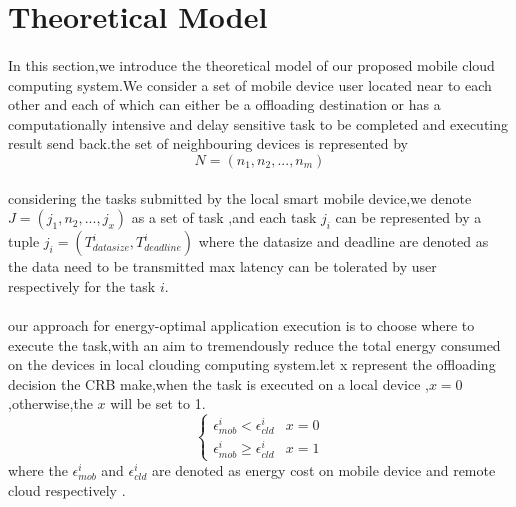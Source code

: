 \documentclass[review]{elsarticle}
\begin{document}
\section{Theoretical Model}
        \paragraph{}
        In this section,we introduce the theoretical model of our proposed mobile cloud computing system.We consider a set of mobile device user located near to each other and each of which can either be a offloading destination or has a computationally intensive and delay sensitive task to be completed and executing result send back.the set of neighbouring devices is represented by
          $$N=(n_{1},n_{2},...,n_{m})$$
        \paragraph{} considering the tasks submitted by the local smart mobile device,we denote \begin{math}J=(j_{1},n_{2},...,j_{x})\end{math} as a set of task ,and each task \begin{math} j_{i} \end{math} can be represented by a tuple \begin{math}j_{i}=(T_{datasize}^i,T_{deadline}^i) \end{math} where the datasize and deadline are denoted as the data need to be transmitted max latency can be tolerated by user respectively  for the task \begin{math} i\end{math}.
        \paragraph{} our approach for energy-optimal application execution is  to choose where to execute the task,with an aim to tremendously reduce the total energy consumed on the devices in local clouding computing system.let x represent the offloading decision the CRB make,when the task is executed on a local device ,\begin{math} x=0\end{math},otherwise,the \begin{math} x\end{math} will be set to 1.
        $$\begin{cases}
        {\epsilon_{mob}^i}<{\epsilon_{cld}^i} & x = 0\\
        {\epsilon_{mob}^i}\geq{\epsilon_{cld}^i} & x = 1\end
        {cases}$$
        where the \begin{math}\epsilon_{mob}^i \end{math} and  \begin{math}\epsilon_{cld}^i \end{math} are denoted as energy cost on mobile device and remote cloud respectively .
\end{document}
